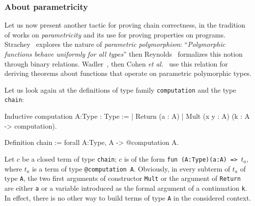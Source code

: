 



\subsubsection{About parametricity}
Let us now present another tactic for proving chain correctness,
in the tradition of works on \emph{parametricity} and its use for 
proving properties on programs.
Strachey~\cite{Strachey:2000:FCP:609150.609208}
explores the nature of \emph{parametric
polymorphism}: ``\emph{Polymorphic functions behave uniformly for all types}''
then Reynolds~\cite{REYNOLDS83} formalizes this notion through binary relations.
Wadler~\cite{Wadler1989}, then Cohen \emph{et al.}~\cite{Cohen2013}
use this relation for deriving
 theorems about functions that operate on parametric
polymorphic types.

Let us look again at the definitions of type family \texttt{computation}
and the type \texttt{chain}:

\begin{Coqsrc}
Inductive computation {A:Type}  : Type :=
| Return (a : A)
| Mult (x y : A) (k : A -> computation).

Definition chain := forall A:Type, A -> @computation A.
\end{Coqsrc}

Let $c$ be a closed term of type 
\texttt{chain}; $c$ is  of the form \linebreak
\texttt{fun (A:Type)(a:A) => $t_a$}, where $t_a$ is a term of type
\texttt{@computation A}.
\label{obvious-remark}
Obviously,  in every subterm of {$t_a$} of type \texttt{A}, 
the two first arguments of constructor \texttt{Mult} or the
argument of \texttt{Return} are either \texttt{a} or a variable 
introduced as the formal argument of a continuation \texttt{k}.
In effect, there is no other way to build terms of type \texttt{A} in the considered context.

